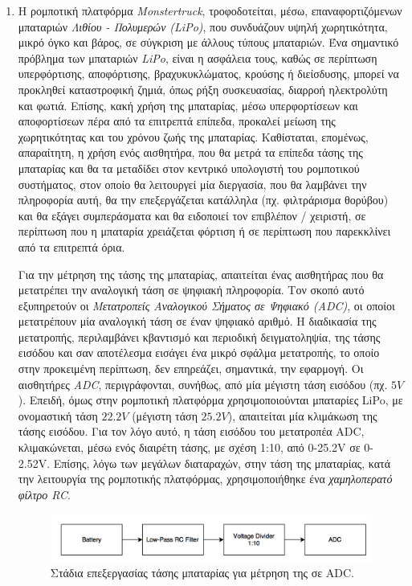 \begin{enumerate}
\bigskip
\item
Η ρομποτική πλατφόρμα \textit{Monstertruck}, τροφοδοτείται, μέσω, επαναφορτιζόμενων μπαταριών \textit{Λιθίου - Πολυμερών (LiPo)}, που συνδυάζουν υψηλή χωρητικότητα, μικρό όγκο και βάρος, σε σύγκριση με άλλους τύπους μπαταριών. Ένα σημαντικό πρόβλημα των μπαταριών \textit{LiPo}, είναι η ασφάλεια τους, καθώς σε περίπτωση υπερφόρτισης, αποφόρτισης, βραχυκυκλώματος, κρούσης ή διείσδυσης, μπορεί να προκληθεί καταστροφική ζημιά, όπως ρήξη συσκευασίας, διαρροή ηλεκτρολύτη και φωτιά. Επίσης, κακή χρήση της μπαταρίας, μέσω υπερφορτίσεων και αποφορτίσεων πέρα από τα επιτρεπτά επίπεδα, προκαλεί μείωση της χωρητικότητας και του χρόνου ζωής της μπαταρίας. Καθίσταται, επομένως, απαραίτητη, η χρήση ενός αισθητήρα, που θα μετρά τα επίπεδα τάσης της μπαταρίας και θα τα μεταδίδει στον κεντρικό υπολογιστή του ρομποτικού συστήματος, στον οποίο θα λειτουργεί μία διεργασία, που θα λαμβάνει την πληροφορία αυτή, θα την επεξεργάζεται κατάλληλα (πχ. φιλτράρισμα θορύβου) και θα εξάγει συμπεράσματα και θα ειδοποιεί τον επιβλέπον / χειριστή, σε περίπτωση που η μπαταρία χρειάζεται φόρτιση ή σε περίπτωση που παρεκκλίνει από τα επιτρεπτά όρια.

Για την μέτρηση της τάσης της μπαταρίας, απαιτείται ένας αισθητήρας που θα μετατρέπει την αναλογική τάση σε ψηφιακή πληροφορία. Τον σκοπό αυτό εξυπηρετούν οι \textit{Μετατροπείς Αναλογικού Σήματος σε Ψηφιακό (ADC)}, οι οποίοι μετατρέπουν μία αναλογική τάση σε έναν ψηφιακό αριθμό. Η διαδικασία της μετατροπής, περιλαμβάνει κβαντισμό και περιοδική δειγματοληψία, της τάσης εισόδου και σαν αποτέλεσμα εισάγει ένα μικρό σφάλμα μετατροπής, το οποίο στην προκειμένη περίπτωση, δεν επηρεάζει, σημαντικά, την εφαρμογή. Οι αισθητήρες \textit{ADC}, περιγράφονται, συνήθως, από μία μέγιστη τάση εισόδου (πχ. $5V$). Επειδή, όμως στην ρομποτική πλατφόρμα χρησιμοποιούνται μπαταρίες LiPo, με ονομαστική τάση $22.2V$ (μέγιστη τάση $25.2V$), απαιτείται μία κλιμάκωση της τάσης εισόδου. Για τον λόγο αυτό, η τάση εισόδου του μετατροπέα ADC, κλιμακώνεται, μέσω ενός διαιρέτη τάσης, με σχέση 1:10, από 0-25.2V σε 0-2.52V. Επίσης, λόγω των μεγάλων διαταραχών, στην τάση της μπαταρίας, κατά την λειτουργία της ρομποτικής πλατφόρμας, χρησιμοποιήθηκε ένα \textit{χαμηλοπερατό φίλτρο RC}. 

\begin{figure}[!ht]
	\centering
	\includegraphics[width=\linewidth]{Chapters/Chapter2/Figures/rc_filter_divider.png}
	\caption{Στάδια επεξεργασίας τάσης μπαταρίας για μέτρηση της σε ADC.}
	\label{fig:rc_filter_divider}
\end{figure}

\end{enumerate}


